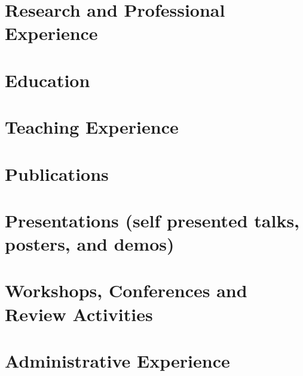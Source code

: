\documentclass[10pt,a4paper,sans]{moderncv}
\begin{document}
\makecvtitle

\section*{}


\section{Research and Professional Experience}


\section{Education}


\section{Teaching Experience}


\section{Publications}
\begin{refsection}[pub]
    \nocite{*}
    \printbibliography[heading=pub]
\end{refsection}

\section{Presentations {\footnotesize (self presented talks, posters, and demos)}}
\begin{refsection}[pre]
    \nocite{*}
    \printbibliography[heading=pre]
\end{refsection}

\section{Workshops, Conferences and Review Activities}


\section{Administrative Experience}

\end{document}
